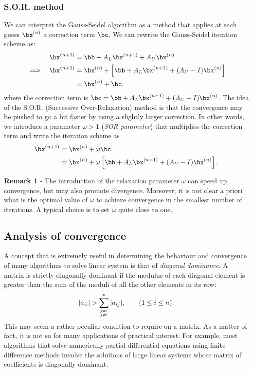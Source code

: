 \subsubsection{S.O.R. method}

We can interpret the Gauss-Seidel algorithm as a method that applies
at each guess $\bx^{(n)}$ a correction term $\bc$.  We can rewrite the
Gauss-Seidel iteration scheme as:
%
\begin{align*}
  && \bx^{(n+1)} & = \bb + A_L \bx^{(n+1)} + A_U \bx^{(n)} \\
  \implies && \bx^{(n+1)} & = \bx^{(n)} + \left [ \bb + A_L \bx^{(n+1)}
    + (A_U - I) \bx^{(n)} \right ] \\ 
  &&             & = \bx^{(n)} + \bc,  
\end{align*}
%
where the correction term is $\bc = \bb + A_L \bx^{(n+1)} + (A_U - I)
\bx^{(n)}$.  The idea of the S.O.R. (Successive Over-Relaxation)
method is that the convergence may be pushed to go a bit faster by
using a slightly larger correction.  In other words, we introduce a
parameter $\omega > 1$ (\textit{SOR parameter}) that multiplies the
correction term and write the iteration scheme as
%
\begin{align*}
  \bx^{(n+1)} & =  \bx^{(n)} + \omega \bc \\
              & =  \bx^{(n)} + \omega
        \left [ \bb + A_L \bx^{(n+1)} + (A_U - I) \bx^{(n)} \right ].
\end{align*}

\noindent \textbf{Remark 1} - The introduction of the relaxation
parameter $\omega$ can speed up convergence, but may also promote
divergence.    Moreover, it is not clear a priori what is the optimal
value of $\omega$ to achieve convergence in the smallest number of
iterations.    A typical choice is to set $\omega$ quite close to one.


\subsection{Analysis of convergence}

A concept that is extremely useful in determining the behaviour and
convergence of many algorithms to solve linear system is that of
\textit{diagonal dominance}.  A matrix is strictly diagonally dominant
if the modulus of each diagonal element is greater than the sum of the
moduli of all the other elements in its row:
% 
\begin{equation*}
  | a_{i i} | > \sum_{\genfrac{}{}{0pt}{}{j=1}{j \ne i}}^n 
  | a_{i j} |, \qquad (1 \le i \le n) .
\end{equation*}
% 
This may seem a rather peculiar condition to require on a matrix.  As
a matter of fact, it is not so for many applications of practical
interest.  For example, most algorithms that solve numerically partial
differential equations using finite difference methods involve the
solutions of large linear systems whose matrix of coefficients is
diagonally dominant.

